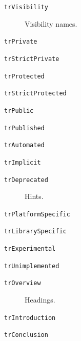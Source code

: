 \documentclass{report}
\begin{document}
\begin{list}{}
\begin{description}
\item[\texttt{trVisibility}] \label{PasDoc_Languages-trVisibility}
\index{}
Visibility names.
\item[\texttt{trPrivate}] \label{PasDoc_Languages-trPrivate}
\index{}
 
\item[\texttt{trStrictPrivate}] \label{PasDoc_Languages-trStrictPrivate}
\index{}
 
\item[\texttt{trProtected}] \label{PasDoc_Languages-trProtected}
\index{}
 
\item[\texttt{trStrictProtected}] \label{PasDoc_Languages-trStrictProtected}
\index{}
 
\item[\texttt{trPublic}] \label{PasDoc_Languages-trPublic}
\index{}
 
\item[\texttt{trPublished}] \label{PasDoc_Languages-trPublished}
\index{}
 
\item[\texttt{trAutomated}] \label{PasDoc_Languages-trAutomated}
\index{}
 
\item[\texttt{trImplicit}] \label{PasDoc_Languages-trImplicit}
\index{}
 
\item[\texttt{trDeprecated}] \label{PasDoc_Languages-trDeprecated}
\index{}
Hints.
\item[\texttt{trPlatformSpecific}] \label{PasDoc_Languages-trPlatformSpecific}
\index{}
 
\item[\texttt{trLibrarySpecific}] \label{PasDoc_Languages-trLibrarySpecific}
\index{}
 
\item[\texttt{trExperimental}] \label{PasDoc_Languages-trExperimental}
\index{}
 
\item[\texttt{trUnimplemented}] \label{PasDoc_Languages-trUnimplemented}
\index{}
 
\item[\texttt{trOverview}] \label{PasDoc_Languages-trOverview}
\index{}
Headings.
\item[\texttt{trIntroduction}] \label{PasDoc_Languages-trIntroduction}
\index{}
 
\item[\texttt{trConclusion}] \label{PasDoc_Languages-trConclusion}
\index{}
 

\end{description}
\end{list}
\end{document}
